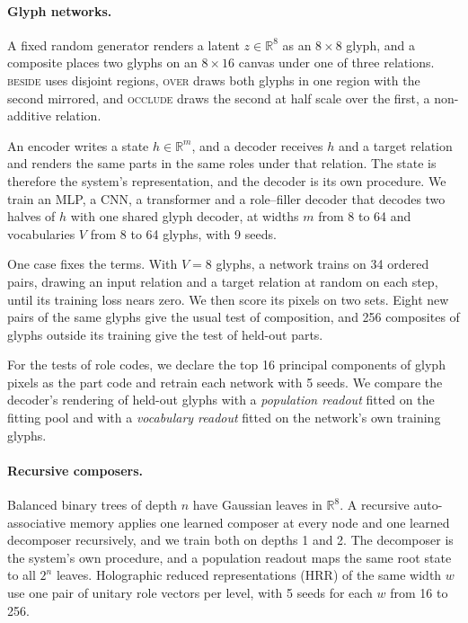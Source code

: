 \documentclass[10pt]{article}
\theoremstyle{plain}
\theoremstyle{remark}
\newcommand{\R}{\mathbb{R}}
\begin{document}
\paragraph{Glyph networks.} A fixed random generator renders a latent $z \in \R^{8}$ as an $8 \times 8$ glyph, and a composite places two glyphs on an $8 \times 16$ canvas under one of three relations. \textsc{beside} uses disjoint regions, \textsc{over} draws both glyphs in one region with the second mirrored, and \textsc{occlude} draws the second at half scale over the first, a non-additive relation.

An encoder writes a state $h \in \R^m$, and a decoder receives $h$ and a target relation and renders the same parts in the same roles under that relation. The state is therefore the system's representation, and the decoder is its own procedure. We train an MLP, a CNN, a transformer and a role--filler decoder that decodes two halves of $h$ with one shared glyph decoder, at widths $m$ from 8 to 64 and vocabularies $V$ from 8 to 64 glyphs, with 9 seeds.

One case fixes the terms. With $V = 8$ glyphs, a network trains on 34 ordered pairs, drawing an input relation and a target relation at random on each step, until its training loss nears zero. We then score its pixels on two sets. Eight new pairs of the same glyphs give the usual test of composition, and 256 composites of glyphs outside its training give the test of held-out parts.

For the tests of role codes, we declare the top 16 principal components of glyph pixels as the part code and retrain each network with 5 seeds. We compare the decoder's rendering of held-out glyphs with a \emph{population readout} fitted on the fitting pool and with a \emph{vocabulary readout} fitted on the network's own training glyphs.

\paragraph{Recursive composers.} Balanced binary trees of depth $n$ have Gaussian leaves in $\R^8$. A recursive auto-associative memory \citep{pollack1990} applies one learned composer at every node and one learned decomposer recursively, and we train both on depths 1 and 2. The decomposer is the system's own procedure, and a population readout maps the same root state to all $2^n$ leaves. Holographic reduced representations (HRR) of the same width $w$ use one pair of unitary role vectors per level, with 5 seeds for each $w$ from 16 to 256.
\end{document}
